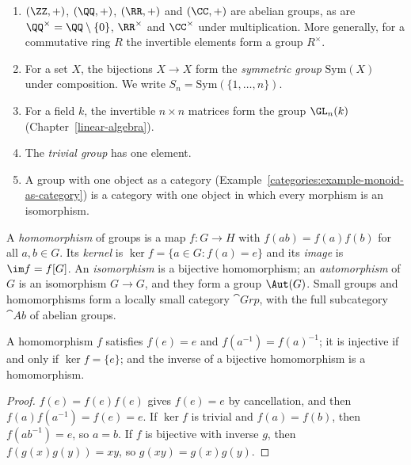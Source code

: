 \begin{example}\label{groups:example-groups}
\begin{enumerate}
\item $(\ZZ, +)$, $(\QQ, +)$, $(\RR, +)$ and $(\CC, +)$ are abelian groups, as are
$\QQ^\times = \QQ \setminus \{0\}$, $\RR^\times$ and $\CC^\times$ under multiplication.
More generally, for a commutative ring $R$ the invertible elements form a group
$R^\times$.
\item For a set $X$, the bijections $X \to X$ form the \emph{symmetric group}
$\mathrm{Sym}(X)$ under composition. We write $S_n = \mathrm{Sym}(\{1, \ldots, n\})$.
\item For a field $k$, the invertible $n \times n$ matrices form the group
$\GL_n(k)$ (Chapter~\ref{linear-algebra}).
\item The \emph{trivial group} has one element.
\item A group with one object as a category (Example~\ref{categories:example-monoid-as-category})
is a category with one object in which every morphism is an isomorphism.
\end{enumerate}
\end{example}

\begin{definition}\label{groups:definition-homomorphism}
A \emph{homomorphism} of groups is a map $f \colon G \to H$ with $f(ab) = f(a)f(b)$
for all $a, b \in G$. Its \emph{kernel} is $\ker f = \{a \in G : f(a) = e\}$ and its
\emph{image} is $\im f = f[G]$. An \emph{isomorphism} is a bijective homomorphism;
an \emph{automorphism} of $G$ is an isomorphism $G \to G$, and they form a group
$\Aut(G)$. Small groups and homomorphisms form a locally small category
$\cat{Grp}$, with the full subcategory $\cat{Ab}$ of abelian groups.
\end{definition}

\begin{lemma}\label{groups:lemma-homomorphism}
A homomorphism $f$ satisfies $f(e) = e$ and $f(a^{-1}) = f(a)^{-1}$; it is
injective if and only if $\ker f = \{e\}$; and the inverse of a bijective
homomorphism is a homomorphism.
\end{lemma}

\begin{proof}
$f(e) = f(e)f(e)$ gives $f(e) = e$ by cancellation, and then
$f(a)f(a^{-1}) = f(e) = e$. If $\ker f$ is trivial and $f(a) = f(b)$, then
$f(ab^{-1}) = e$, so $a = b$. If $f$ is bijective with inverse $g$, then
$f(g(x)g(y)) = xy$, so $g(xy) = g(x)g(y)$.
\end{proof}

